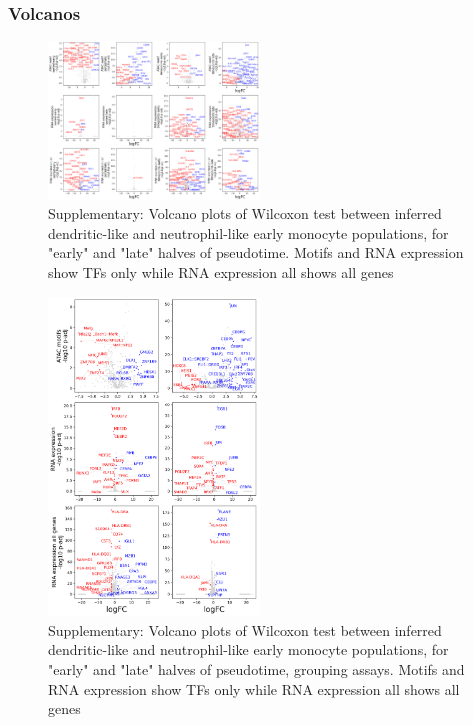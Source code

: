 \documentclass[a4paper]{article}
\begin{document}
\subsubsection{Volcanos}

\begin{figure}[!htb]
  \centering
  \includegraphics[width=0.5\textwidth]{../figures/hematopoiesis/early_groups_detailed_assays.png}
  \caption{Supplementary: Volcano plots of Wilcoxon test between inferred dendritic-like and neutrophil-like early monocyte populations, for "early" and "late" halves of pseudotime. Motifs and RNA expression show TFs only while RNA expression all shows all genes}
\end{figure}

\begin{figure}[!htb]
  \centering
  \includegraphics[width=0.5\textwidth]{../figures/hematopoiesis/early_groups_grouped_assays.png}
  \caption{Supplementary: Volcano plots of Wilcoxon test between inferred dendritic-like and neutrophil-like early monocyte populations, for "early" and "late" halves of pseudotime, grouping assays. Motifs and RNA expression show TFs only while RNA expression all shows all genes}
\end{figure}
\end{document}
